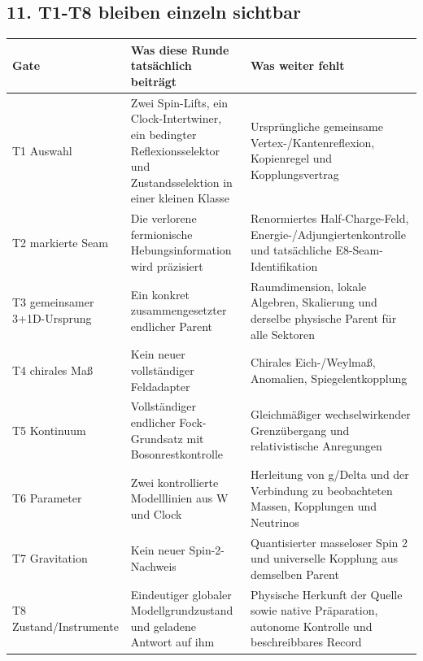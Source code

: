 \subsection{11. T1-T8 bleiben einzeln
sichtbar}\label{t1-t8-bleiben-einzeln-sichtbar}

{\def\LTcaptype{none} %
\begin{longtable}[]{@{}
  >{\raggedright\arraybackslash}p{}
  >{\raggedright\arraybackslash}p{}
  >{\raggedright\arraybackslash}p{}@{}}
\toprule\noalign{}
\begin{minipage}[b]{\linewidth}\raggedright
Gate
\end{minipage} & \begin{minipage}[b]{\linewidth}\raggedright
Was diese Runde tatsächlich beiträgt
\end{minipage} & \begin{minipage}[b]{\linewidth}\raggedright
Was weiter fehlt
\end{minipage} \\
\midrule\noalign{}
\endhead
\bottomrule\noalign{}
\endlastfoot
T1 Auswahl & Zwei Spin-Lifts, ein Clock-Intertwiner, ein bedingter
Reflexionsselektor und Zustandsselektion in einer kleinen Klasse &
Ursprüngliche gemeinsame Vertex-/Kantenreflexion, Kopienregel und
Kopplungsvertrag \\
T2 markierte Seam & Die verlorene fermionische Hebungsinformation wird
präzisiert & Renormiertes Half-Charge-Feld,
Energie-/Adjungiertenkontrolle und tatsächliche
E8-Seam-Identifikation \\
T3 gemeinsamer 3+1D-Ursprung & Ein konkret zusammengesetzter endlicher
Parent & Raumdimension, lokale Algebren, Skalierung und derselbe
physische Parent für alle Sektoren \\
T4 chirales Maß & Kein neuer vollständiger Feldadapter & Chirales
Eich-/Weylmaß, Anomalien, Spiegelentkopplung \\
T5 Kontinuum & Vollständiger endlicher Fock-Grundsatz mit
Bosonrestkontrolle & Gleichmäßiger wechselwirkender Grenzübergang und
relativistische Anregungen \\
T6 Parameter & Zwei kontrollierte Modelllinien aus W und Clock &
Herleitung von g/Delta und der Verbindung zu beobachteten Massen,
Kopplungen und Neutrinos \\
T7 Gravitation & Kein neuer Spin-2-Nachweis & Quantisierter masseloser
Spin 2 und universelle Kopplung aus demselben Parent \\
T8 Zustand/Instrumente & Eindeutiger globaler Modellgrundzustand und
geladene Antwort auf ihm & Physische Herkunft der Quelle sowie native
Präparation, autonome Kontrolle und beschreibbares Record \\
\end{longtable}
}

